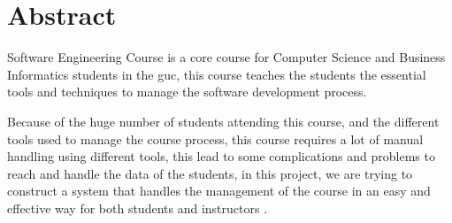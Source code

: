 \chapter*{Abstract}
\label{chap:abstract}

Software Engineering Course is a core course for Computer Science and Business Informatics students in the \ac{guc},
this course teaches the students the essential tools and techniques to manage the software development process.

\vspace{\baselineskip}
\noindent
Because of the huge number of students attending this course, and the different tools used to manage the course process, this course requires a lot of manual
handling using different tools, this lead to some complications and problems to reach and handle the data of the students, in this project, we are trying to construct a system that handles the management of the course in an easy and effective
way for both students and instructors .
